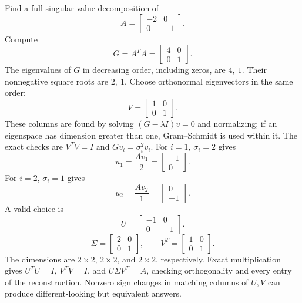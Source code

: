 \goal Find a full singular value decomposition of
\[A=\begin{bmatrix}-2&0\\0&-1\end{bmatrix}.\]
Compute
\[G=A^TA=\begin{bmatrix}4&0\\0&1\end{bmatrix}.\]
The eigenvalues of $G$ in decreasing order, including zeros, are $4,\ 1$. Their nonnegative square roots are $2,\ 1$. Choose orthonormal eigenvectors in the same order:
\[V=\begin{bmatrix}1&0\\0&1\end{bmatrix}.\]
These columns are found by solving $(G-\lambda I)v=0$ and normalizing; if an eigenspace has dimension greater than one, Gram--Schmidt is used within it. The exact checks are $V^TV=I$ and $Gv_i=\sigma_i^2v_i$.
For $i=1$, $\sigma_i=2$ gives
\[u_{1}=\frac{Av_{1}}{2}=\begin{bmatrix}-1\\0\end{bmatrix}.\]
For $i=2$, $\sigma_i=1$ gives
\[u_{2}=\frac{Av_{2}}{1}=\begin{bmatrix}0\\-1\end{bmatrix}.\]
A valid choice is
\[U=\begin{bmatrix}-1&0\\0&-1\end{bmatrix}.\]
\[\Sigma=\begin{bmatrix}2&0\\0&1\end{bmatrix},\qquad V^T=\begin{bmatrix}1&0\\0&1\end{bmatrix}.\]
The dimensions are $2\times2$, $2\times2$, and $2\times2$, respectively. Exact multiplication gives $U^TU=I$, $V^TV=I$, and $U\Sigma V^T=A$, checking orthogonality and every entry of the reconstruction. Nonzero sign changes in matching columns of $U,V$ can produce different-looking but equivalent answers.


